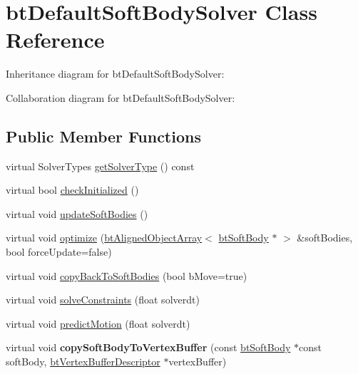 \hypertarget{classbt_default_soft_body_solver}{\section{bt\+Default\+Soft\+Body\+Solver Class Reference}
\label{classbt_default_soft_body_solver}
}


Inheritance diagram for bt\+Default\+Soft\+Body\+Solver\+:


Collaboration diagram for bt\+Default\+Soft\+Body\+Solver\+:
\subsection*{Public Member Functions}
\begin{DoxyCompactItemize}
\item 
virtual Solver\+Types \hyperlink{classbt_default_soft_body_solver_aa7a57ae4ec280810d545aa359b82293a}{get\+Solver\+Type} () const 
\item 
virtual bool \hyperlink{classbt_default_soft_body_solver_afa91458c5c1bf45d11bd0cc2b5a8fc71}{check\+Initialized} ()
\item 
virtual void \hyperlink{classbt_default_soft_body_solver_a28c27dd170396900b6e79379d5781610}{update\+Soft\+Bodies} ()
\item 
virtual void \hyperlink{classbt_default_soft_body_solver_a6092bc7e7c762770b9202c231025120b}{optimize} (\hyperlink{classbt_aligned_object_array}{bt\+Aligned\+Object\+Array}$<$ \hyperlink{classbt_soft_body}{bt\+Soft\+Body} $\ast$ $>$ \&soft\+Bodies, bool force\+Update=false)
\item 
virtual void \hyperlink{classbt_default_soft_body_solver_ad56d843b5c510c0cb1e2399e20ab212a}{copy\+Back\+To\+Soft\+Bodies} (bool b\+Move=true)
\item 
virtual void \hyperlink{classbt_default_soft_body_solver_a039cf1be486f6493be0983df3f4f1fbf}{solve\+Constraints} (float solverdt)
\item 
virtual void \hyperlink{classbt_default_soft_body_solver_a4fc93a921db26b802b6f9fa05d9a7d6b}{predict\+Motion} (float solverdt)
\item 
\hypertarget{classbt_default_soft_body_solver_a651d0c25d0a08e4d7dfe30d820c3e312}{virtual void {\bfseries copy\+Soft\+Body\+To\+Vertex\+Buffer} (const \hyperlink{classbt_soft_body}{bt\+Soft\+Body} $\ast$const soft\+Body, \hyperlink{classbt_vertex_buffer_descriptor}{bt\+Vertex\+Buffer\+Descriptor} $\ast$vertex\+Buffer)}\label{classbt_default_soft_body_solver_a651d0c25d0a08e4d7dfe30d820c3e312}


\end{DoxyCompactItemize}
